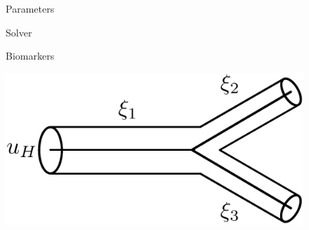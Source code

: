 \documentclass[compress]{beamer}
\begin{document}
\begin{frame}
\begin{figure}[]
{\begin{minipage}[c][0.33\paperheight][c]{\linewidth}
\begin{minipage}{0.1\linewidth}
				\end{minipage}
		\end{minipage}}
		\vfill
		\begin{minipage}[t][0.06\paperheight][t]{\linewidth}
			\begin{minipage}{0.18\linewidth}
				\caption*{\tiny Parameters}
			\end{minipage}
			\hfill
			\begin{minipage}{0.1\linewidth}
				\caption*{\tiny}
			\end{minipage}
			\hfill
			\begin{minipage}{0.18\linewidth}
				\caption*{\tiny Solver}
			\end{minipage}
			\hfill
			\begin{minipage}{0.1\linewidth}
				\caption*{\tiny}
			\end{minipage}
			\hfill
			\begin{minipage}{0.18\linewidth}
				\caption*{\tiny Biomarkers}
			\end{minipage}
			\hfill
			\begin{minipage}{0.1\linewidth}
				\caption*{\tiny}
			\end{minipage}
		\end{minipage}
			\begin{minipage}[c][0.33\paperheight][c]{\linewidth}
				\begin{minipage}{0.18\linewidth}
					\includegraphics[width=\linewidth]{images/bifurcation.eps}
				\end{minipage}
				\hfill
				\begin{minipage}{0.1\linewidth}

\end{minipage}
\end{minipage}
\end{figure}
\end{frame}
\end{document}
